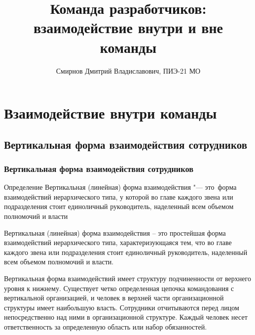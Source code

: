 \documentclass{../industrial-development}
\title{Команда разработчиков: взаимодействие внутри и вне команды}
\author{Смирнов Дмитрий Владиславович, ПИЭ-21 МО}
\date{}
\begin{document}
\begin{frame}
  \titlepage
\end{frame}


\section{Взаимодействие внутри команды}

\subsection{Вертикальная форма взаимодействия сотрудников}

\begin{frame} \frametitle{Вертикальная форма взаимодействия сотрудников}
  \begin{block}{Определение}
\alert{Вертикальная (линейная) форма взаимодействия} "--- это~форма взаимодействий иерархического типа, у которой во главе каждого звена или подразделения стоит единоличный руководитель, наделенный всем объемом полномочий и власти
  \end{block}
\end{frame}

\lecturenotes
Вертикальная (линейная) форма взаимодействия –  это простейшая форма взаимодействий иерархического типа, характеризующаяся тем, что во главе каждого звена или подразделения стоит единоличный руководитель, наделенный всем объемом полномочий и власти. 

 Вертикальная форма взаимодействий имеет структуру подчиненности от верхнего уровня к нижнему. Существует четко определенная цепочка командования с вертикальной организацией, и человек в верхней части организационной структуры имеет наибольшую власть. Сотрудники отчитываются перед лицом непосредственно над ними в организационной структуре. Каждый человек несет ответственность за определенную область или набор обязанностей.
\end{document}
